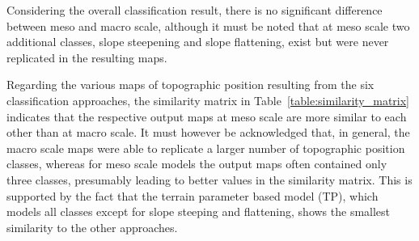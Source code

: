 \documentclass[preprint,12pt,authoryear]{elsarticle}
\begin{document}
Considering the overall classification result, there is no significant difference between meso and macro scale, although it must be noted that at meso scale two additional classes, slope steepening and slope flattening, exist but were never replicated in the resulting maps.

Regarding the various maps of topographic position resulting from the six classification approaches, the similarity matrix in Table~\ref{table:similarity_matrix} indicates that the respective output maps at meso scale are more similar to each other than at macro scale. It must however be acknowledged that, in general, the macro scale maps  were able to replicate a larger number of topographic position classes, whereas for meso scale models the output maps often contained only three classes, presumably leading to better values in the similarity matrix. This is supported by the fact that the terrain parameter based model (TP), which models all classes except for slope steeping and flattening, shows the smallest similarity to the other approaches.
\end{document}
